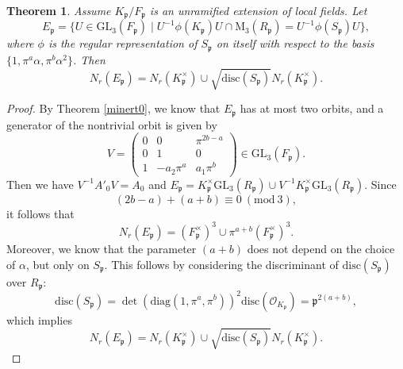 \documentclass[12pt]{article}
\theoremstyle{plain}
\newtheorem{theorem}{Theorem}[section]
\theoremstyle{definition}
\theoremstyle{remark}
\begin{document}
\begin{theorem}\label{minert}
Assume $K_\mathfrak{p}/F_\mathfrak{p}$ is an unramified extension of local fields. Let 
$$E_\mathfrak{p}=\{U\in \mathrm{GL}_3(F_\mathfrak{p})\mid U^{-1}\phi(K_\mathfrak{p})U\cap \mathrm{M}_3(R_\mathfrak{p})= U^{-1}\phi(S_\mathfrak{p})U\},$$ 
where $\phi$ is the regular representation of $S_\mathfrak{p}$ on itself with respect to the basis $\{1, \pi^a\alpha, \pi^b\alpha^2\}$. Then 
$$N_r(E_\mathfrak{p})=N_r(K^\times_\mathfrak{p})\cup \sqrt{\mathrm{disc}(S_\mathfrak{p})}N_r(K^\times_\mathfrak{p}).$$
\end{theorem}
\begin{proof}
By Theorem \ref{minert0}, we know that $E_\mathfrak{p}$ has at most two orbits, and a generator of the nontrivial orbit is given by  
$$V=\begin{pmatrix}
0 & 0 & \pi^{2b-a} \\
0 & 1 & 0 \\
1 & -a_2\pi^a & a_1\pi^b
\end{pmatrix}\in \mathrm{GL}_3(F_\mathfrak{p}).$$
Then we have $V^{-1}A'_0 V = A_0$ and $E_\mathfrak{p}=K_\mathfrak{p}^\times\mathrm{GL}_3(R_\mathfrak{p})\cup V^{-1}K_\mathfrak{p}^\times\mathrm{GL}_3(R_\mathfrak{p})$. Since 
$$(2b-a)+(a+b)\equiv 0 \ (\mathrm{mod}\ 3),$$
it follows that 
$$N_r(E_\mathfrak{p})=(F^\times_\mathfrak{p})^3\cup \pi^{a+b}(F^\times_\mathfrak{p})^3.$$
Moreover, we know that the parameter $(a+b)$ does not depend on the choice of $\alpha$, but only on $S_\mathfrak{p}$. This follows by considering the discriminant of $\mathrm{disc}(S_\mathfrak{p})$ over $R_\mathfrak{p}$: 
$$\mathrm{disc}(S_\mathfrak{p})=\det(\mathrm{diag}(1,\pi^a,\pi^b))^2\mathrm{disc}(\mathcal{O}_{K_\mathfrak{p}})=\mathfrak{p}^{2(a+b)},$$
which implies 
$$N_r(E_\mathfrak{p})=N_r(K^\times_\mathfrak{p})\cup \sqrt{\mathrm{disc}(S_\mathfrak{p})}N_r(K^\times_\mathfrak{p}).$$
\end{proof}
\end{document}
